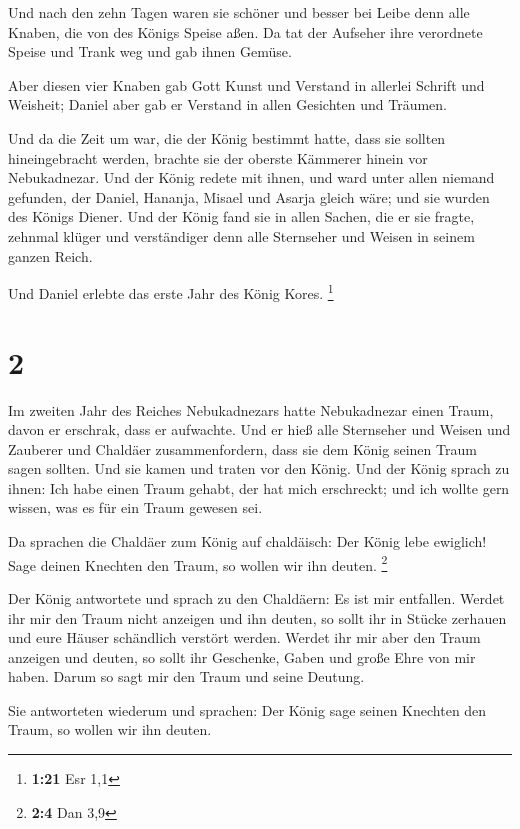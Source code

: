  Und nach den zehn Tagen waren sie schöner und besser bei
Leibe denn alle Knaben, die von des Königs Speise aßen. 
Da tat der Aufseher ihre verordnete Speise und Trank weg und gab ihnen
Gemüse.

 Aber diesen vier Knaben gab Gott Kunst und Verstand in
allerlei Schrift und Weisheit; Daniel aber gab er Verstand in allen
Gesichten und Träumen.

 Und da die Zeit um war, die der König bestimmt hatte,
dass sie sollten hineingebracht werden, brachte sie der oberste Kämmerer
hinein vor Nebukadnezar.  Und der König redete mit ihnen,
und ward unter allen niemand gefunden, der Daniel, Hananja, Misael und
Asarja gleich wäre; und sie wurden des Königs Diener. 
Und der König fand sie in allen Sachen, die er sie fragte, zehnmal
klüger und verständiger denn alle Sternseher und Weisen in seinem ganzen
Reich.

 Und Daniel erlebte das erste Jahr des König Kores.
\footnote{\textbf{1:21} Esr 1,1}

\hypertarget{section-1}{%
\section{2}\label{section-1}}

 Im zweiten Jahr des Reiches Nebukadnezars hatte
Nebukadnezar einen Traum, davon er erschrak, dass er aufwachte.
 Und er hieß alle Sternseher und Weisen und Zauberer und
Chaldäer zusammenfordern, dass sie dem König seinen Traum sagen sollten.
Und sie kamen und traten vor den König.  Und der König
sprach zu ihnen: Ich habe einen Traum gehabt, der hat mich erschreckt;
und ich wollte gern wissen, was es für ein Traum gewesen sei.

 Da sprachen die Chaldäer zum König auf chaldäisch: Der
König lebe ewiglich! Sage deinen Knechten den Traum, so wollen wir ihn
deuten. \footnote{\textbf{2:4} Dan 3,9}

 Der König antwortete und sprach zu den Chaldäern: Es ist
mir entfallen. Werdet ihr mir den Traum nicht anzeigen und ihn deuten,
so sollt ihr in Stücke zerhauen und eure Häuser schändlich verstört
werden.  Werdet ihr mir aber den Traum anzeigen und
deuten, so sollt ihr Geschenke, Gaben und große Ehre von mir haben.
Darum so sagt mir den Traum und seine Deutung.

 Sie antworteten wiederum und sprachen: Der König sage
seinen Knechten den Traum, so wollen wir ihn deuten.

